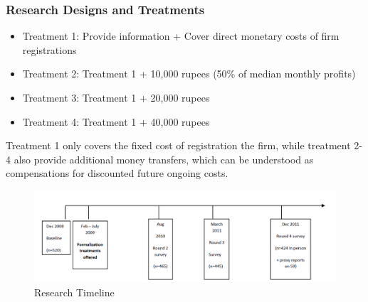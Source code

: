         \subsubsection{Research Designs and Treatments}
            \begin{itemize}
                \item Treatment 1: Provide information + Cover direct monetary costs of firm registrations
                \item Treatment 2: Treatment 1 + 10,000 rupees (50\% of median monthly profits)
                \item Treatment 3: Treatment 1 + 20,000 rupees
                \item Treatment 4: Treatment 1 + 40,000 rupees
            \end{itemize}
            Treatment 1 only covers the fixed cost of registration the firm, while treatment 2-4 also provide additional money transfers, which can be understood as compensations for discounted future ongoing costs.
            \begin{figure}[H]
                \centering
                \includegraphics[width=5.5in]{images/ch5/SL formal treatment 1.png}
                \caption{Research Timeline}
            \end{figure}
